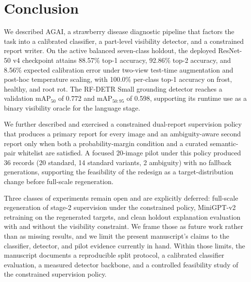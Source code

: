 \section{Conclusion}

We described AGAI, a strawberry disease diagnostic pipeline that
factors the task into a calibrated classifier, a part-level visibility
detector, and a constrained report writer. On the active balanced
seven-class holdout, the deployed ResNet-50 v4 checkpoint attains
88.57\% top-1 accuracy, 92.86\% top-2 accuracy, and 8.56\% expected
calibration error under two-view test-time augmentation and post-hoc
temperature scaling, with 100.0\% per-class top-1 accuracy on frost,
healthy, and root rot. The RF-DETR Small grounding detector reaches a
validation $\mathrm{mAP}_{50}$ of 0.772 and $\mathrm{mAP}_{50:95}$ of
0.598, supporting its runtime use as a binary visibility oracle for the
language stage.

We further described and exercised a constrained dual-report
supervision policy that produces a primary report for every image and
an ambiguity-aware second report only when both a probability-margin
condition and a curated semantic-pair whitelist are satisfied. A
focused 20-image pilot under this policy produced 36 records (20
standard, 14 standard variants, 2 ambiguity) with no fallback
generations, supporting the feasibility of the redesign as a
target-distribution change before full-scale regeneration.

Three classes of experiments remain open and are explicitly deferred:
full-scale regeneration of stage-2 supervision under the constrained
policy, MiniGPT-v2 retraining on the regenerated targets, and clean
holdout explanation evaluation with and without the visibility
constraint. We frame those as future work rather than as missing
results, and we limit the present manuscript's claims to the
classifier, detector, and pilot evidence currently in hand. Within those
limits, the manuscript documents a reproducible split protocol, a
calibrated classifier evaluation, a measured detector backbone, and a
controlled feasibility study of the constrained supervision policy.

